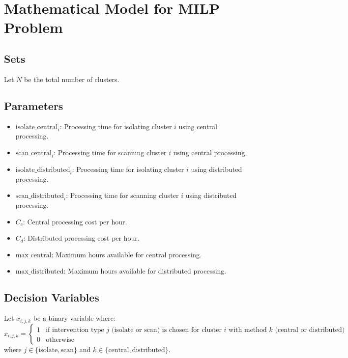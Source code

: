 \documentclass{article}
\begin{document}
\section*{Mathematical Model for MILP Problem}

\subsection*{Sets}
Let \( N \) be the total number of clusters.

\subsection*{Parameters}
\begin{itemize}
    \item \( \text{isolate\_central}_{i} \): Processing time for isolating cluster \( i \) using central processing.
    \item \( \text{scan\_central}_{i} \): Processing time for scanning cluster \( i \) using central processing.
    \item \( \text{isolate\_distributed}_{i} \): Processing time for isolating cluster \( i \) using distributed processing.
    \item \( \text{scan\_distributed}_{i} \): Processing time for scanning cluster \( i \) using distributed processing.
    \item \( C_c \): Central processing cost per hour.
    \item \( C_d \): Distributed processing cost per hour.
    \item \( \text{max\_central} \): Maximum hours available for central processing.
    \item \( \text{max\_distributed} \): Maximum hours available for distributed processing.
\end{itemize}

\subsection*{Decision Variables}
Let \( x_{i,j,k} \) be a binary variable where:
\[
x_{i,j,k} = \begin{cases}
1 & \text{if intervention type } j \text{ (isolate or scan) is chosen for cluster } i \text{ with method } k \text{ (central or distributed)} \\
0 & \text{otherwise}
\end{cases}
\]
where \( j \in \{ \text{isolate}, \text{scan} \} \) and \( k \in \{ \text{central}, \text{distributed} \} \).
\end{document}
